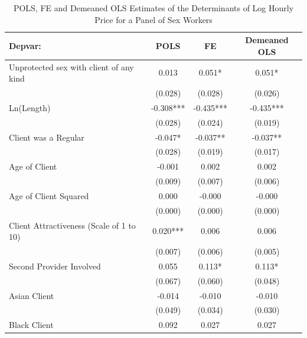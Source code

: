 \documentclass{beamer}
\begin{document}
\begin{frame}[plain]
\begin{table}[htbp]\centering
\tiny
\caption{POLS, FE and Demeaned OLS Estimates of the Determinants of Log Hourly Price for a Panel of Sex Workers}
\label{sasp}
\begin{center}
\begin{threeparttable}
\begin{tabular}{l*{3}{c}}
\toprule
\multicolumn{1}{l}{\textbf{Depvar:}}&
\multicolumn{1}{c}{\textbf{POLS}}&
\multicolumn{1}{c}{\textbf{FE}}&
\multicolumn{1}{c}{\textbf{Demeaned OLS}}\\
\midrule
Unprotected sex with client of any kind					&       0.013   &       0.051*  &       0.051* \\
                    									&     (0.028)   &     (0.028)   &     (0.026) \\
Ln(Length)          									&      -0.308***&      -0.435***&      -0.435*** \\
                    									&     (0.028)   &     (0.024)   &     (0.019) \\
Client was a Regular									&      -0.047*  &      -0.037** &      -0.037** \\
                    									&     (0.028)   &     (0.019)   &     (0.017) \\
Age of Client       									&      -0.001   &       0.002   &       0.002 \\
                    									&     (0.009)   &     (0.007)   &     (0.006) \\
Age of Client Squared									&       0.000   &      -0.000   &      -0.000 \\
                    									&     (0.000)   &     (0.000)   &     (0.000) \\
Client Attractiveness (Scale of 1 to 10)				&       0.020***&       0.006   &       0.006 \\
                    									&     (0.007)   &     (0.006)   &     (0.005) \\
Second Provider Involved								&       0.055   &       0.113*  &       0.113* \\
                    									&     (0.067)   &     (0.060)   &     (0.048) \\
Asian Client        									&      -0.014   &      -0.010   &      -0.010 \\
                    									&     (0.049)   &     (0.034)   &     (0.030) \\
Black Client        									&       0.092   &       0.027   &       0.027 \\

\end{tabular}
\end{threeparttable}
\end{center}
\end{table}
\end{frame}
\end{document}
